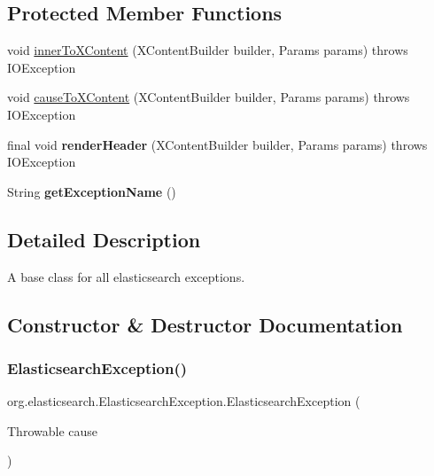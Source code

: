 \subsection*{Protected Member Functions}
\begin{DoxyCompactItemize}
\item 
void \hyperlink{classorg_1_1elasticsearch_1_1_elasticsearch_exception_a05b642f5d4bc79afdd5629c2a003c889}{inner\+To\+X\+Content} (X\+Content\+Builder builder, Params params)  throws I\+O\+Exception 
\item 
void \hyperlink{classorg_1_1elasticsearch_1_1_elasticsearch_exception_a0213b3882cf8a48f095b86df44951a96}{cause\+To\+X\+Content} (X\+Content\+Builder builder, Params params)  throws I\+O\+Exception 
\item 
\hypertarget{classorg_1_1elasticsearch_1_1_elasticsearch_exception_a016c38190f5f3c9cd6ea8ec564ddba82}{}\label{classorg_1_1elasticsearch_1_1_elasticsearch_exception_a016c38190f5f3c9cd6ea8ec564ddba82} 
final void {\bfseries render\+Header} (X\+Content\+Builder builder, Params params)  throws I\+O\+Exception 
\item 
\hypertarget{classorg_1_1elasticsearch_1_1_elasticsearch_exception_aa4623ee8db90b46459cfdadc1df14b80}{}\label{classorg_1_1elasticsearch_1_1_elasticsearch_exception_aa4623ee8db90b46459cfdadc1df14b80} 
String {\bfseries get\+Exception\+Name} ()
\end{DoxyCompactItemize}


\subsection{Detailed Description}
A base class for all elasticsearch exceptions. 

\subsection{Constructor \& Destructor Documentation}
\hypertarget{classorg_1_1elasticsearch_1_1_elasticsearch_exception_ae6a6289693dfd265ad9167eb30918c3f}{}\label{classorg_1_1elasticsearch_1_1_elasticsearch_exception_ae6a6289693dfd265ad9167eb30918c3f} 
\subsubsection{\texorpdfstring{Elasticsearch\+Exception()}{ElasticsearchException()}\hspace{0.1cm}{\footnotesize\ttfamily [1/3]}}
{\footnotesize\ttfamily org.\+elasticsearch.\+Elasticsearch\+Exception.\+Elasticsearch\+Exception (\begin{DoxyParamCaption}\item[{Throwable}]{cause }\end{DoxyParamCaption})}

